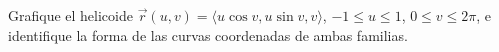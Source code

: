 Grafique el helicoide $\vec r(u,v)=\langle u\cos v,u\sin v,v\rangle$, $-1\leq u\leq1$, $0\leq v\leq2\pi$, e identifique la forma de las curvas coordenadas de ambas familias.
